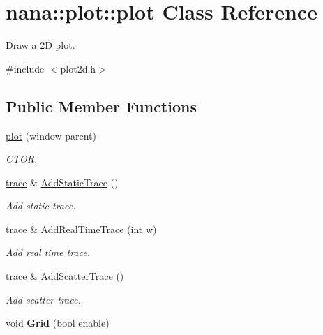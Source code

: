 \hypertarget{classnana_1_1plot_1_1plot}{\section{nana\-:\-:plot\-:\-:plot Class Reference}
\label{classnana_1_1plot_1_1plot}
}


Draw a 2\-D plot.  




{\ttfamily \#include $<$plot2d.\-h$>$}

\subsection*{Public Member Functions}
\begin{DoxyCompactItemize}
\item 
\hyperlink{classnana_1_1plot_1_1plot_a36277db9ef5e9405e7a6b9621d10d539}{plot} (window parent)
\begin{DoxyCompactList}\small\item\em C\-T\-O\-R. \end{DoxyCompactList}\item 
\hyperlink{classnana_1_1plot_1_1trace}{trace} \& \hyperlink{classnana_1_1plot_1_1plot_ac537d6bd9cb05cd1702d71f9b721ddde}{Add\-Static\-Trace} ()
\begin{DoxyCompactList}\small\item\em Add static trace. \end{DoxyCompactList}\item 
\hyperlink{classnana_1_1plot_1_1trace}{trace} \& \hyperlink{classnana_1_1plot_1_1plot_a4cc1af8e943cecf919b2662c4d71c20c}{Add\-Real\-Time\-Trace} (int w)
\begin{DoxyCompactList}\small\item\em Add real time trace. \end{DoxyCompactList}\item 
\hyperlink{classnana_1_1plot_1_1trace}{trace} \& \hyperlink{classnana_1_1plot_1_1plot_a753b33d190cc2cbe2ba4176cec7b49d0}{Add\-Scatter\-Trace} ()
\begin{DoxyCompactList}\small\item\em Add scatter trace. \end{DoxyCompactList}\item 
\hypertarget{classnana_1_1plot_1_1plot_a0df7cfca181bb0f2c58f83cfe7bcbea1}{void {\bfseries Grid} (bool enable)}\label{classnana_1_1plot_1_1plot_a0df7cfca181bb0f2c58f83cfe7bcbea1}


\end{DoxyCompactItemize}
